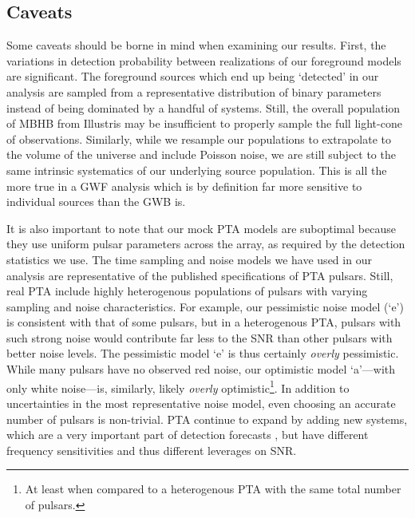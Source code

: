 \documentclass[useAMS, usenatbib]{mnras}  %
\begin{document}
    \subsection{Caveats}
        \label{sec:caveats}

        Some caveats should be borne in mind when examining our results.  First, the variations in detection probability between realizations of our foreground models are significant.  The foreground sources which end up being `detected' in our analysis are sampled from a representative distribution of binary parameters instead of being dominated by a handful of systems.  Still, the overall population of MBHB from Illustris may be insufficient to properly sample the full light-cone of observations.  Similarly, while we resample our populations to extrapolate to the volume of the universe and include Poisson noise, we are still subject to the same intrinsic systematics of our underlying source population.  This is all the more true in a GWF analysis which is by definition far more sensitive to individual sources than the GWB is.

        It is also important to note that our mock PTA models are suboptimal because they use uniform pulsar parameters across the array, as required by the detection statistics we use.  The time sampling and noise models we have used in our analysis are representative of the published specifications of PTA pulsars.  Still, real PTA include highly heterogenous populations of pulsars with varying sampling and noise characteristics.  For example, our pessimistic noise model (`e') is consistent with that of some pulsars, but in a heterogenous PTA, pulsars with such strong noise would contribute far less to the SNR than other pulsars with better noise levels.  The pessimistic model `e' is thus certainly \textit{overly} pessimistic.  While many pulsars have no observed red noise, our optimistic model `a'---with only white noise---is, similarly, likely \textit{overly} optimistic\footnote{At least when compared to a heterogenous PTA with the same total number of pulsars.}.  In addition to uncertainties in the most representative noise model, even choosing an accurate number of pulsars is non-trivial.  PTA continue to expand by adding new systems, which are a very important part of detection forecasts \citep[e.g.][]{taylor2016}, but have different frequency sensitivities and thus different leverages on SNR.
\end{document}
